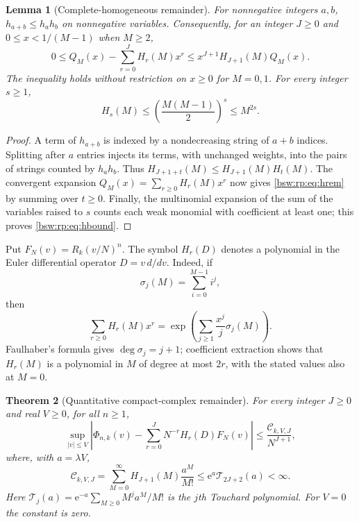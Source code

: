 \documentclass[11pt,letterpaper]{article}
\newtheorem{theorem}{Theorem}[section]
\newtheorem{lemma}[theorem]{Lemma}
\theoremstyle{definition}
\theoremstyle{remark}
\newcommand{\ee}{\mathrm e}
\begin{document}
\begin{lemma}[Complete-homogeneous remainder]\label{bsw:rp:lem:h}
For nonnegative integers $a,b$, $h_{a+b}\le h_a h_b$ on nonnegative
variables.  Consequently, for an integer $J\ge0$ and $0\le x<1/(M-1)$ when
$M\ge2$,
\begin{equation}\label{bsw:rp:eq:hrem}
 0\le Q_M(x)-\sum_{r=0}^JH_r(M)x^r
 \le x^{J+1}H_{J+1}(M)Q_M(x).
\end{equation}
The inequality holds without restriction on $x\ge0$ for $M=0,1$.  For
every integer $s\ge1$,
\begin{equation}\label{bsw:rp:eq:hbound}
 H_s(M)\le\left(\frac{M(M-1)}2\right)^s\le M^{2s}.
\end{equation}
\end{lemma}

\begin{proof}
A term of $h_{a+b}$ is indexed by a nondecreasing string of $a+b$ indices.
Splitting after $a$ entries injects its terms, with unchanged weights, into
the pairs of strings counted by $h_a h_b$.  Thus
$H_{J+1+t}(M)\le H_{J+1}(M)H_t(M)$.  The convergent expansion
$Q_M(x)=\sum_{r\ge0}H_r(M)x^r$ now gives \eqref{bsw:rp:eq:hrem} by summing
over $t\ge0$.  Finally, the multinomial expansion of the sum of the
variables raised to $s$ counts each weak monomial with coefficient at least
one; this proves \eqref{bsw:rp:eq:hbound}.
\end{proof}

Put $F_N(v)=R_k(v/N)^n$.  The symbol $H_r(D)$ denotes a polynomial in the
Euler differential operator $D=v\,d/dv$.  Indeed, if
\[
 \sigma_j(M)=\sum_{i=0}^{M-1}i^j,
\]
then
\begin{equation}\label{bsw:rp:eq:formalh}
 \sum_{r\ge0}H_r(M)x^r
 =\exp\left(\sum_{j\ge1}\frac{x^j}{j}\sigma_j(M)\right).
\end{equation}
Faulhaber's formula gives $\deg\sigma_j=j+1$; coefficient extraction shows
that $H_r(M)$ is a polynomial in $M$ of degree at most $2r$, with the
stated values also at $M=0$.

\begin{theorem}[Quantitative compact-complex remainder]\label{bsw:rp:thm:operator}
For every integer $J\ge0$ and real $V\ge0$, for all $n\ge1$,
\begin{equation}\label{bsw:rp:eq:operr}
 \sup_{|v|\le V}\left|\Phi_{n,k}(v)-\sum_{r=0}^J N^{-r}H_r(D)F_N(v)\right|
 \le \frac{\mathcal C_{k,V,J}}{N^{J+1}},
\end{equation}
where, with $a=\lambda V$,
\begin{equation}\label{bsw:rp:eq:constant}
 \mathcal C_{k,V,J}=\sum_{M=0}^{\infty}H_{J+1}(M)\frac{a^M}{M!}
 \le \ee^a\mathcal T_{2J+2}(a)<\infty.
\end{equation}
Here $\mathcal T_j(a)=\ee^{-a}\sum_{M\ge0}M^j a^M/M!$ is the $j$th
Touchard polynomial.  For $V=0$ the constant is zero.
\end{theorem}
\end{document}
